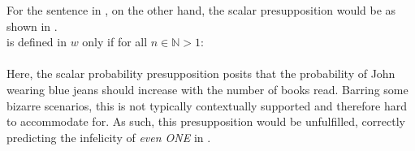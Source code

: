 For the sentence in , on the other hand, the scalar presupposition would be as shown in .
\ex
{}\\ is defined in $w$ only if for all $n\in\mathbb{N}>1$:\\
\\
\resizebox{395pt}{!}{$\forall v:v\in f_\leqslant([\lambda w'_s.\exists_n{x}[\predicate{read}(j,x,w')\land\predicate{book}(x,w')]],w)[\exists{y}[\predicate{wear}(j,y,v)\land\predicate{jeans}(y,v)]$}
\xe
Here, the scalar probability presupposition posits that the probability of John wearing blue jeans should increase with the number of books read. Barring some bizarre scenarios, this is not typically contextually supported and therefore hard to accommodate for. As such, this presupposition would be unfulfilled, correctly predicting the infelicity of \textit{even \MakeUppercase{one}} in .

